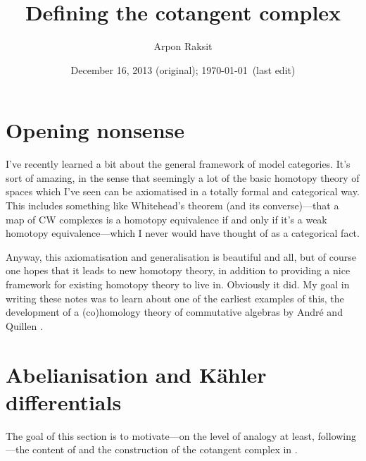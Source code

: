 


\title{Defining the cotangent complex}
\author{Arpon Raksit}
\date{December 16, 2013 (original); \today\ (last edit)}


\maketitle
\thispagestyle{fancy}



\renewcommand{\C}{\mathcal{C}}

\section*{Opening nonsense}

I've recently learned a bit about the general framework of model
categories. It's sort of amazing, in the sense that seemingly a lot of
the basic homotopy theory of spaces which I've seen can be axiomatised
in a totally formal and categorical way. This includes something like
Whitehead's theorem (and its converse)---that a map of CW complexes is
a homotopy equivalence if and only if it's a weak homotopy
equivalence---which I never would have thought of as a categorical
fact.

Anyway, this axiomatisation and generalisation is beautiful and all,
but of course one hopes that it leads to new homotopy theory, in
addition to providing a nice framework for existing homotopy theory to
live in. Obviously it did. My goal in writing these notes was to learn
about one of the earliest examples of this, the development of a
(co)homology theory of commutative algebras by Andr\'{e}
\cite{andre-cotangent} and Quillen \cite{quillen-cotangent}.


\newcommand{\ab}{\operatorname{ab}}

\section{Abelianisation and K\"ahler differentials}

The goal of this section is to motivate---on the level of analogy at
least, following \cite{goerss-modelsimplicial}---the content of
 and the construction of the cotangent complex in
.

